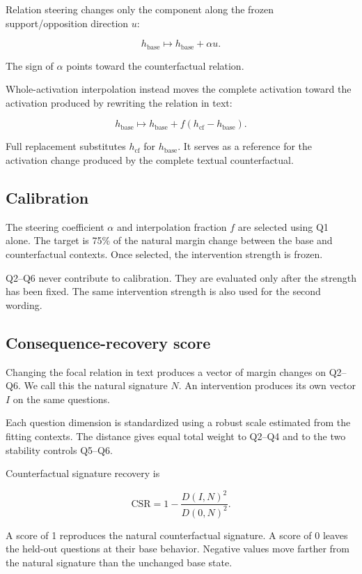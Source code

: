 \documentclass{article}
\begin{document}
Relation steering changes only the component along the frozen
support/opposition direction $u$:

\[
h_{\mathrm{base}}
\mapsto
h_{\mathrm{base}}+\alpha u.
\]

The sign of $\alpha$ points toward the counterfactual relation.

Whole-activation interpolation instead moves the complete activation toward
the activation produced by rewriting the relation in text:

\[
h_{\mathrm{base}}
\mapsto
h_{\mathrm{base}}
+
f\left(h_{\mathrm{cf}}-h_{\mathrm{base}}\right).
\]

Full replacement substitutes $h_{\mathrm{cf}}$ for $h_{\mathrm{base}}$.
It serves as a reference for the activation change produced by the complete
textual counterfactual.

\subsection{Calibration}

The steering coefficient $\alpha$ and interpolation fraction $f$ are selected
using Q1 alone. The target is 75\% of the natural margin change between the
base and counterfactual contexts. Once selected, the intervention strength is
frozen.

Q2--Q6 never contribute to calibration. They are evaluated only after the
strength has been fixed. The same intervention strength is also used for the
second wording.

\subsection{Consequence-recovery score}

Changing the focal relation in text produces a vector of margin changes on
Q2--Q6. We call this the natural signature $N$. An intervention produces its
own vector $I$ on the same questions.

Each question dimension is standardized using a robust scale estimated from
the fitting contexts. The distance gives equal total weight to Q2--Q4 and to
the two stability controls Q5--Q6.

Counterfactual signature recovery is

\[
\mathrm{CSR}
=
1-
\frac{D(I,N)^2}
     {D(0,N)^2}.
\]

A score of 1 reproduces the natural counterfactual signature. A score of 0
leaves the held-out questions at their base behavior. Negative values move
farther from the natural signature than the unchanged base state.
\end{document}
